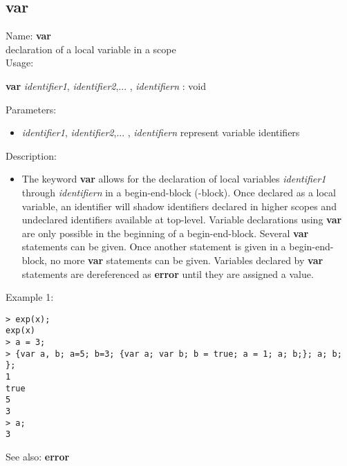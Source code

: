 \subsection{ var }
\noindent Name: \textbf{var}\\
declaration of a local variable in a scope\\

\noindent Usage: 
\begin{center}
\textbf{var} \emph{identifier1}, \emph{identifier2},... , \emph{identifiern} : \textsf{void}\\
\end{center}
Parameters: 
\begin{itemize}
\item \emph{identifier1}, \emph{identifier2},... , \emph{identifiern} represent variable identifiers
\end{itemize}
\noindent Description: \begin{itemize}

\item The keyword \textbf{var} allows for the declaration of local variables
   \emph{identifier1} through \emph{identifiern} in a begin-end-block ({}-block).
   Once declared as a local variable, an identifier will shadow
   identifiers declared in higher scopes and undeclared identifiers
   available at top-level.
   Variable declarations using \textbf{var} are only possible in the
   beginning of a begin-end-block. Several \textbf{var} statements can be
   given. Once another statement is given in a begin-end-block, no more
   \textbf{var} statements can be given.
   Variables declared by \textbf{var} statements are dereferenced as \textbf{error}
   until they are assigned a value. 
\end{itemize}
\noindent Example 1: 
\begin{center}\begin{minipage}{15cm}\begin{Verbatim}[frame=single]
> exp(x); 
exp(x)
> a = 3; 
> {var a, b; a=5; b=3; {var a; var b; b = true; a = 1; a; b;}; a; b; }; 
1
true
5
3
> a;
3
\end{Verbatim}
\end{minipage}\end{center}
See also: \textbf{error}
